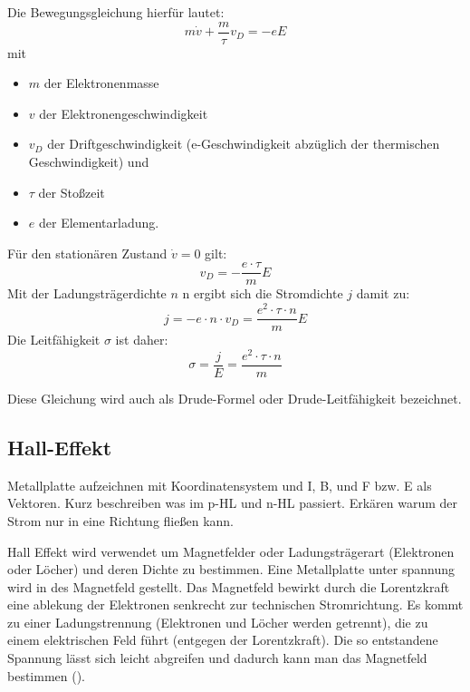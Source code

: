 Die Bewegungsgleichung hierfür lautet:
\begin{equation}
    m \dot v + \frac{m}{\tau} v_D = -eE
\end{equation}
mit
\begin{itemize}
    \item $m$ der Elektronenmasse
    \item $v$ der Elektronengeschwindigkeit
    \item $v_D$ der Driftgeschwindigkeit (e-Geschwindigkeit abzüglich der thermischen Geschwindigkeit) und
    \item $\tau$ der Stoßzeit
    \item $e$ der Elementarladung.
\end{itemize}
Für den stationären Zustand $\dot v=0$ gilt:
\begin{equation}
    v_D = -\frac{e\cdot \tau}{m}E
\end{equation}
Mit der Ladungsträgerdichte $n$ n ergibt sich die Stromdichte $j$ damit zu:
\begin{equation}
    j = -e \cdot n \cdot v_D = \frac{e^2 \cdot \tau \cdot n}{m}E
\end{equation}
Die Leitfähigkeit $\sigma$ ist daher:
\begin{equation}
    \sigma = \frac{j}{E} = \frac{e^2 \cdot \tau \cdot n}{m}
\end{equation}

Diese Gleichung wird auch als Drude-Formel oder Drude-Leitfähigkeit bezeichnet. 

\subsection{Hall-Effekt }\label{k3:halleffekt}
Metallplatte aufzeichnen mit Koordinatensystem und I, B, und F bzw. E als Vektoren.
Kurz beschreiben was im p-HL und n-HL passiert.
Erk\"aren warum der Strom nur in eine Richtung flie{\ss}en kann.

Hall Effekt wird verwendet um Magnetfelder oder Ladungsträgerart (Elektronen oder L\"ocher) und deren Dichte zu bestimmen.
Eine Metallplatte unter spannung wird in des Magnetfeld gestellt.
Das Magnetfeld bewirkt durch die Lorentzkraft eine ablekung der Elektronen senkrecht zur technischen Stromrichtung.
Es kommt zu einer Ladungstrennung (Elektronen und Löcher werden getrennt), die zu einem elektrischen Feld führt (entgegen der
Lorentzkraft). Die so entstandene Spannung lässt sich leicht abgreifen und dadurch kann man das Magnetfeld bestimmen
().

